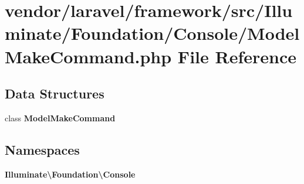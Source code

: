 \section{vendor/laravel/framework/src/\+Illuminate/\+Foundation/\+Console/\+Model\+Make\+Command.php File Reference}
\label{_model_make_command_8php}
\subsection*{Data Structures}
\begin{DoxyCompactItemize}
\item 
class {\bf Model\+Make\+Command}
\end{DoxyCompactItemize}
\subsection*{Namespaces}
\begin{DoxyCompactItemize}
\item 
 {\bf Illuminate\textbackslash{}\+Foundation\textbackslash{}\+Console}
\end{DoxyCompactItemize}
